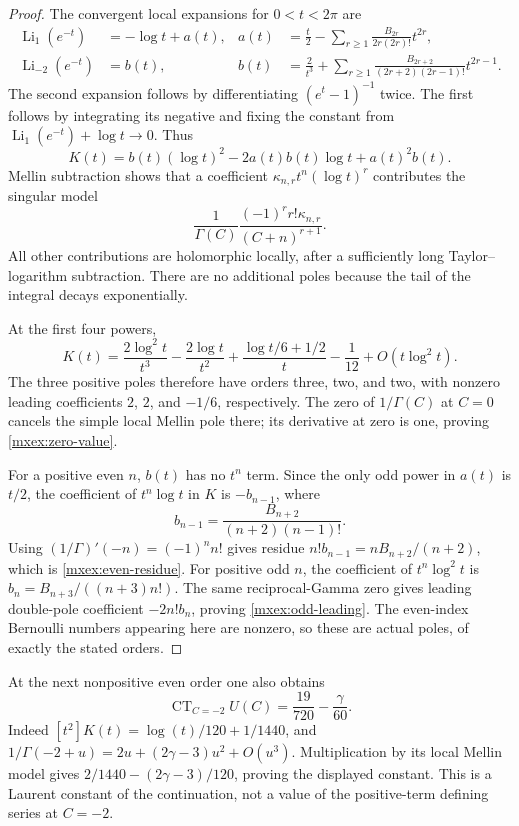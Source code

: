 \documentclass[11pt]{article}
\numberwithin{equation}{section}
\theoremstyle{plain}
\theoremstyle{definition}
\theoremstyle{remark}
\DeclareMathOperator{\CT}{CT}
\begin{document}
\begin{proof}
The convergent local expansions for $0<t<2\pi$ are
\begin{align*}
 \operatorname{Li}_1(e^{-t})&=-\log t+a(t),&
 a(t)&=\frac t2-\sum_{r\geq1}
             \frac{B_{2r}}{2r(2r)!}t^{2r},\\
 \operatorname{Li}_{-2}(e^{-t})&=b(t),&
 b(t)&=\frac2{t^3}+\sum_{r\geq1}
             \frac{B_{2r+2}}{(2r+2)(2r-1)!}t^{2r-1}.
\end{align*}
The second expansion follows by differentiating
$(e^t-1)^{-1}$ twice.  The first follows by integrating its negative
and fixing the constant from
$\operatorname{Li}_1(e^{-t})+\log t\to0$.
Thus
\[
 K(t)=b(t)(\log t)^2-2a(t)b(t)\log t+a(t)^2b(t).
\]
Mellin subtraction shows that a coefficient
$\kappa_{n,r}t^n(\log t)^r$ contributes the singular model
\[
 \frac1{\Gamma(C)}
 \frac{(-1)^r r!\kappa_{n,r}}{(C+n)^{r+1}}.
\]
All other contributions are holomorphic locally, after a sufficiently
long Taylor--logarithm subtraction.  There are no additional poles
because the tail of the integral decays exponentially.

At the first four powers,
\begin{equation}\label{mxex:local-first}
 K(t)=\frac{2\log^2t}{t^3}
       -\frac{2\log t}{t^2}
       +\frac{\log t/6+1/2}{t}
       -\frac1{12}+O(t\log^2t).
\end{equation}
The three positive poles therefore have orders three, two, and two,
with nonzero leading coefficients $2$, $2$, and $-1/6$, respectively.
The zero of $1/\Gamma(C)$ at $C=0$ cancels the simple local Mellin
pole there; its derivative at zero is one, proving
\eqref{mxex:zero-value}.

For a positive even $n$, $b(t)$ has no $t^n$ term.  Since the only
odd power in $a(t)$ is $t/2$, the coefficient of $t^n\log t$ in
$K$ is $-b_{n-1}$, where
\[
 b_{n-1}=\frac{B_{n+2}}{(n+2)(n-1)!}.
\]
Using $(1/\Gamma)'(-n)=(-1)^n n!$ gives residue
$n!b_{n-1}=nB_{n+2}/(n+2)$, which is
\eqref{mxex:even-residue}.  For positive odd $n$, the coefficient
of $t^n\log^2t$ is
$b_n=B_{n+3}/((n+3)n!)$.  The same reciprocal-Gamma zero gives
leading double-pole coefficient $-2n!b_n$, proving
\eqref{mxex:odd-leading}.  The even-index Bernoulli numbers appearing
here are nonzero, so these are actual poles, of exactly the stated
orders.
\end{proof}


At the next nonpositive even order one also obtains
\begin{equation}\label{mixed:Uminus2}
 \CT_{C=-2}U(C)=\frac{19}{720}-\frac{\gamma}{60}.
\end{equation}
Indeed $[t^2]K(t)=\log(t)/120+1/1440$, and
$1/\Gamma(-2+u)=2u+(2\gamma-3)u^2+O(u^3)$.
Multiplication by its local Mellin model gives
$2/1440-(2\gamma-3)/120$, proving the displayed constant.
This is a Laurent constant of the continuation, not a value of the
positive-term defining series at $C=-2$.
\end{document}
